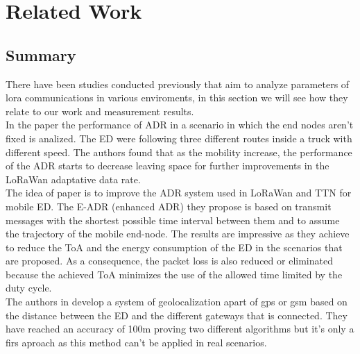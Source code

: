 
\chapter{Related Work}
\label{chap:second}
\ifpdf
    \graphicspath{{Chapter2/Figures/PNG/}{Chapter2/Figures/PDF/}{Chapter1/Figures/}}
\else
    \graphicspath{{Chapter2/Figures/EPS/}{Chapter2/Figures/}}
\fi

\section*{Summary}


There have been studies conducted previously that aim to analyze parameters of lora communications in various enviroments, 
in this section we will see how they relate to our work and measurement results.\\

In the paper \cite{kousias2019empirical} the performance of ADR in a scenario in which the end nodes aren’t fixed is analized. 
The ED were following three different routes inside a truck with different speed. The authors found 
that as the mobility increase, the performance of the ADR starts to decrease leaving space for 
further improvements in the LoRaWan adaptative data rate.\\

The idea of paper \cite{benkahla2019enhanced} is to improve the ADR system used in LoRaWan and TTN for mobile ED. The E-ADR (enhanced ADR) 
they propose is based on transmit messages with the shortest possible time interval between them and to assume the 
trajectory of the mobile end-node. The results are impressive as they achieve to reduce the ToA and the energy 
consumption of the ED in the scenarios that are proposed. As a consequence, the packet loss is also reduced or 
eliminated because the achieved ToA minimizes the use of the allowed time limited by the duty cycle.\\

The authors in \cite{fargas2017gps} develop a system of geolocalization apart of gps or gsm based on the distance between the ED 
and the different gateways that is connected. They have reached an accuracy of 100m proving two different algorithms but it’s only a firs 
aproach as this method can’t be applied in real scenarios.


\label{sec:sa-temp}
